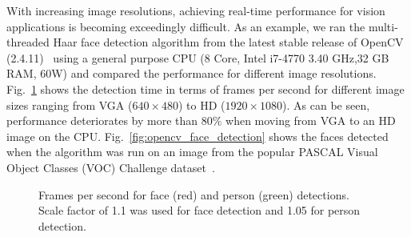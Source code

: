 With increasing image resolutions, achieving real-time performance for vision applications is becoming exceedingly difficult. 
As an example, we ran the multi-threaded Haar face detection algorithm from the latest 
stable release of OpenCV (2.4.11)~\cite{OpenCV} using 
a general purpose CPU (8 Core, Intel i7-4770 3.40 GHz,32 GB RAM, 60W) and compared the performance 
for different image resolutions.
Fig.~\ref{fig:face_fps} shows the detection time in terms of frames per second  for different image sizes ranging from VGA ($640\times480$) 
to HD ($1920\times1080$).
As can be seen, performance deteriorates by more than 80\% when moving from VGA to an HD image on the CPU.
Fig.~\ref{fig:opencv_face_detection} shows the faces detected when the algorithm was run on an image 
from the popular PASCAL Visual Object Classes (VOC) Challenge dataset~\cite{Everingham2010}.

\begin{figure}[!htb]
\centering
{}
\caption{Frames per second for face (red) and person (green) detections. Scale factor of 1.1 was used for face detection and 1.05 for person detection.}
\label{fig:face_fps}
\end{figure}

